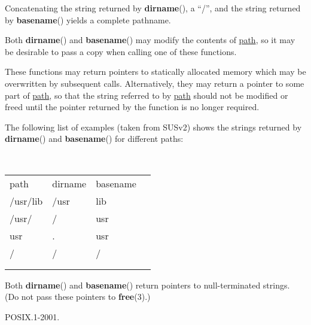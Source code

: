 \documentclass[]{article}
\let\realtextbf=\textbf
\renewcommand{\textbf}[1]{\textcolor{boldcolor}{\realtextbf{#1}}}
\renewcommand{\emph}[1]{\underline{#1}}
\begin{document}
Concatenating the string returned by \textbf{dirname}(), a ``/'', and
the string returned by \textbf{basename}() yields a complete pathname.

Both \textbf{dirname}() and \textbf{basename}() may modify the contents
of \emph{path}, so it may be desirable to pass a copy when calling one
of these functions.

These functions may return pointers to statically allocated memory which
may be overwritten by subsequent calls. Alternatively, they may return a
pointer to some part of \emph{path}, so that the string referred to by
\emph{path} should not be modified or freed until the pointer returned
by the function is no longer required.

The following list of examples (taken from SUSv2) shows the strings
returned by \textbf{dirname}() and \textbf{basename}() for different
paths:

~

\begin{longtable}[c]{@{}llll@{}}
\toprule\addlinespace
path & dirname & basename &
\\\addlinespace
/usr/lib & /usr & lib &
\\\addlinespace
/usr/ & / & usr &
\\\addlinespace
usr & . & usr &
\\\addlinespace
/ & / & / &
\\\addlinespace
& & &
\\\addlinespace
\bottomrule
\end{longtable}


Both \textbf{dirname}() and \textbf{basename}() return pointers to
null-terminated strings. (Do not pass these pointers to
\textbf{free}(3).)


POSIX.1-2001.

\end{document}
